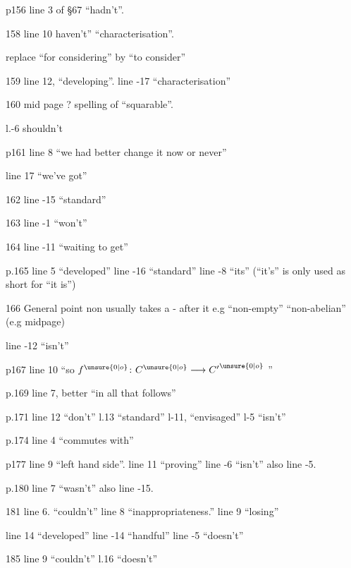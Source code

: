 
p156 line 3 of \S67 ``hadn't''.

158 line 10 haven't'' ``characterisation''.

replace ``for considering'' by ``to consider''

159 line 12, ``developing''. line -17 ``characterisation''

160 mid page ? spelling of ``squarable''.

l.-6 shouldn't

p161 line 8  ``we had better change it now or never''

line 17 ``we've got''

162 line -15 ``standard'' 

163 line -1 ``won't''

164 line -11 ``waiting to get''

p.165 line 5 ``developed'' line -16 ``standard'' line -8 ``its'' (``it's'' is only used as short for ``it is'')

166 General point non usually takes a - after it e.g ``non-empty'' ``non-abelian'' (e.g midpage)

line -12 ``isn't''

p167 line 10 ``so  $f^{\unsure{0|o}}\colon C^{\unsure{0|o}}\longrightarrow {C'}^{\unsure{0|o}}$ ''

p.169 line 7, better ``in all that follows'' 

p.171 line 12 ``don't'' l.13 ``standard'' l-11, ``envisaged'' l-5 ``isn't''

p.174 line 4 ``commutes with''

p177 line 9 ``left hand side''. line 11 ``proving'' line -6 ``isn't'' also line -5.

p.180 line 7 ``wasn't'' also line -15.

181 line 6. ``couldn't'' line 8 ``inappropriateness.'' line 9 ``losing''

line 14 ``developed'' line -14 ``handful'' line -5 ``doesn't''

185 line 9 ``couldn't'' l.16 ``doesn't''

